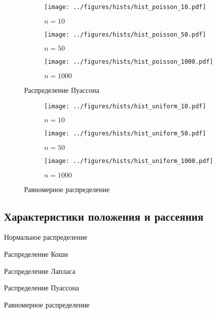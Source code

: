 \documentclass[12pt]{article}
\begin{document}
	\begin{figure}[H]
		\centering
		\begin{subfigure}[t]{.3\linewidth}
			\centering\texttt{[image: ../figures/hists/hist\_poisson\_10.pdf]}
			\caption*{$n = 10$}
		\end{subfigure}
		\begin{subfigure}[t]{.3\linewidth}
			\centering\texttt{[image: ../figures/hists/hist\_poisson\_50.pdf]}
			\caption*{$n = 50$}
		\end{subfigure}
		\begin{subfigure}[t]{.3\linewidth}
			\centering\texttt{[image: ../figures/hists/hist\_poisson\_1000.pdf]}
			\caption*{$n = 1000$}
		\end{subfigure}
		\caption{Распределение Пуассона}
	\end{figure}
	\begin{figure}[H]
		\centering
		\begin{subfigure}[t]{.3\linewidth}
			\centering\texttt{[image: ../figures/hists/hist\_uniform\_10.pdf]}
			\caption*{$n = 10$}
		\end{subfigure}
		\begin{subfigure}[t]{.3\linewidth}
			\centering\texttt{[image: ../figures/hists/hist\_uniform\_50.pdf]}
			\caption*{$n = 50$}
		\end{subfigure}
		\begin{subfigure}[t]{.3\linewidth}
			\centering\texttt{[image: ../figures/hists/hist\_uniform\_1000.pdf]}
			\caption*{$n = 1000$}
		\end{subfigure}
		\caption{Равномерное распределение}
	\end{figure}

	\subsection{Характеристики положения и рассеяния}
	
	\begin{table}[H]
		\centering
		
		\caption{Нормальное распределение}
	\end{table}
	\begin{table}[H]
		\centering
		
		\caption{Распределение Коши}
	\end{table}
	\begin{table}[H]
		\centering
		
		\caption{Распределение Лапласа}
	\end{table}
	\begin{table}[H]
		\centering
		
		\caption{Распределение Пуассона}
	\end{table}
	\begin{table}[H]
		\centering
		
		\caption{Равномерное распределение}
	\end{table}
\end{document}
